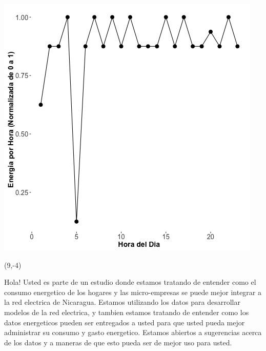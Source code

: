 \documentclass{article}\usepackage[]{graphicx}\usepackage[]{color}
\newenvironment{knitrout}{}{} %
\begin{document}
\begin{knitrout}
\color{fgcolor}
\includegraphics[scale=0.75]{figure/A21_fplot_norm_median} 
\end{knitrout}

 \begin{textblock}{1}(9,-4)
\begin{minipage}{20em}
\begingroup

\endgroup
\end{minipage}
\end{textblock}

\vspace{70px}
\begin{knitrout}
Hola! Usted es parte de un estudio donde estamos tratando de entender como el consumo energetico de los hogares y las micro-empresas se puede mejor integrar a la red electrica de Nicaragua. Estamos utilizando los datos para desarrollar modelos de la red electrica, y tambien estamos tratando de entender como los datos energeticos pueden ser entregados a usted para que usted pueda mejor administrar su consumo y gasto energetico.  Estamos abiertos a sugerencias acerca de los datos y a maneras de que esto pueda ser de mejor uso para usted.
\end{knitrout}
\end{document}
